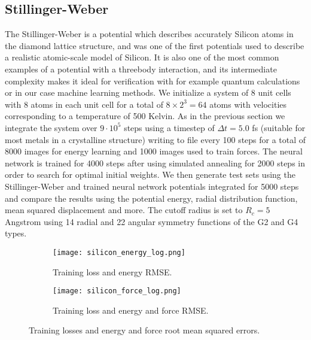 \subsection{Stillinger-Weber}
The Stillinger-Weber is a potential which describes accurately
Silicon atoms in the diamond lattice structure, and was
one of the first potentials used to describe a realistic atomic-scale
model of Silicon. It is also one of the most common examples
of a potential with a threebody interaction, and its intermediate complexity
makes it ideal for verification with for example quantum calculations
or in our case machine learning methods.
We initialize a system of 8 unit cells with 8 atoms in each unit cell
for a total of $8 \times 2^3 = 64$ atoms with velocities corresponding
to a temperature of 500 Kelvin.
As in the previous section we integrate the system over $9 \cdot 10^5$
steps using a timestep of $\Delta t = 5.0$ fs (suitable for most metals
in a crystalline structure) writing to file every 100 steps
for a total of 8000 images for energy learning
and 1000 images used to train forces.
The neural network is trained for 4000 steps after using simulated annealing
for 2000 steps in order to search for optimal initial weights.
We then generate test sets using the Stillinger-Weber and trained neural network
potentials integrated for 5000 steps and compare the results 
using the potential energy, radial distribution function, 
mean squared displacement and more.
The cutoff radius is set to $R_c = 5$ Angstrom using 14 radial and
22 angular symmetry functions of the G2 and G4 types.

\begin{figure}[H]
\begin{adjustbox}{max width=1.2\linewidth,center}
\centering
  \begin{subfigure}[b]{0.55\textwidth}
      \texttt{[image: silicon\_energy\_log.png]}
    \caption{Training loss and energy RMSE.}
  \end{subfigure}
  \hfill
  \begin{subfigure}[b]{0.55\textwidth}
      \texttt{[image: silicon\_force\_log.png]}
    \caption{Training loss and energy and force RMSE.}
  \end{subfigure}
\end{adjustbox}
\caption{Training losses and energy and force root mean squared errors.}
    \label{fig:silicon-log}
\end{figure}


